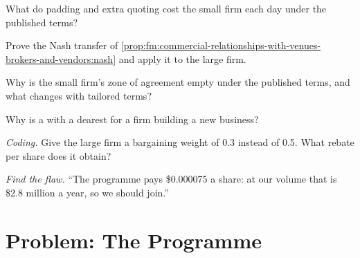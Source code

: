 \begin{exercise}[$\star$]\label{exo:fm:commercial-relationships-with-venues-brokers-and-vendors:3}
What do padding and extra quoting cost the small firm each day under the published terms?
\end{exercise}

\begin{exercise}[$\star\star$]\label{exo:fm:commercial-relationships-with-venues-brokers-and-vendors:4}
Prove the Nash transfer of \cref{prop:fm:commercial-relationships-with-venues-brokers-and-vendors:nash} and apply it to the large firm.
\end{exercise}

\begin{exercise}[$\star\star$]\label{exo:fm:commercial-relationships-with-venues-brokers-and-vendors:5}
Why is the small firm's zone of agreement empty under the published terms, and what changes with tailored terms?
\end{exercise}

\begin{exercise}[$\star\star$]\label{exo:fm:commercial-relationships-with-venues-brokers-and-vendors:6}
Why is a  with a  dearest for a firm building a new business?
\end{exercise}

\begin{exercise}[$\star\star\star$]\label{exo:fm:commercial-relationships-with-venues-brokers-and-vendors:7}
\emph{Coding.} Give the large firm a bargaining weight of 0.3 instead of 0.5. What rebate per share does it obtain?
\end{exercise}

\begin{exercise}[$\star\star\star$]\label{exo:fm:commercial-relationships-with-venues-brokers-and-vendors:8}
\emph{Find the flaw.} ``The programme pays \$0.000075 a share: at our volume that is \$2.8 million a year, so we should join.''
\end{exercise}

\section{Problem: The Programme}

